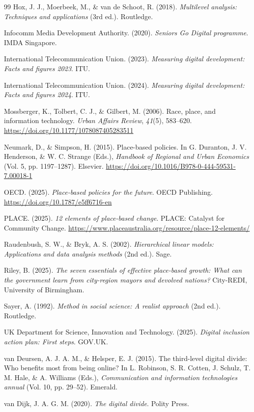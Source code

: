 \begin{thebibliography}{99}
Hox, J. J., Moerbeek, M., \& van de Schoot, R. (2018). \textit{Multilevel analysis: Techniques and applications} (3rd ed.). Routledge.

Infocomm Media Development Authority. (2020). \textit{Seniors Go Digital programme}. IMDA Singapore.

International Telecommunication Union. (2023). \textit{Measuring digital development: Facts and figures 2023}. ITU.

International Telecommunication Union. (2024). \textit{Measuring digital development: Facts and figures 2024}. ITU.

Mossberger, K., Tolbert, C. J., \& Gilbert, M. (2006). Race, place, and information technology. \textit{Urban Affairs Review}, \textit{41}(5), 583--620. \url{https://doi.org/10.1177/1078087405283511}

Neumark, D., \& Simpson, H. (2015). Place-based policies. In G. Duranton, J. V. Henderson, \& W. C. Strange (Eds.), \textit{Handbook of Regional and Urban Economics} (Vol. 5, pp. 1197--1287). Elsevier. \url{https://doi.org/10.1016/B978-0-444-59531-7.00018-1}

OECD. (2025). \textit{Place-based policies for the future}. OECD Publishing. \url{https://doi.org/10.1787/e5ff6716-en}

PLACE. (2025). \textit{12 elements of place-based change}. PLACE: Catalyst for Community Change. \url{https://www.placeaustralia.org/resource/place-12-elements/}

Raudenbush, S. W., \& Bryk, A. S. (2002). \textit{Hierarchical linear models: Applications and data analysis methods} (2nd ed.). Sage.

Riley, B. (2025). \textit{The seven essentials of effective place-based growth: What can the government learn from city-region mayors and devolved nations?} City-REDI, University of Birmingham.

Sayer, A. (1992). \textit{Method in social science: A realist approach} (2nd ed.). Routledge.

UK Department for Science, Innovation and Technology. (2025). \textit{Digital inclusion action plan: First steps}. GOV.UK.

van Deursen, A. J. A. M., \& Helsper, E. J. (2015). The third-level digital divide: Who benefits most from being online? In L. Robinson, S. R. Cotten, J. Schulz, T. M. Hale, \& A. Williams (Eds.), \textit{Communication and information technologies annual} (Vol. 10, pp. 29--52). Emerald.

van Dijk, J. A. G. M. (2020). \textit{The digital divide}. Polity Press.

\end{thebibliography}
